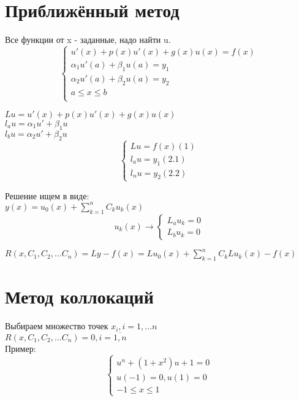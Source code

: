 \section{Приближённый метод}
Все функции от x - заданные, надо найти u.
\begin{equation}
\begin{cases}
u'(x) + p(x)u'(x) + g(x)u(x) = f(x)\\
\alpha_{1}u'(a) + \beta_{1}u(a) = y_{1}\\
\alpha_{2}u'(a) + \beta_{2}u(a) = y_{2}\\
a \leqslant x \leqslant b\\
\end{cases}
\end{equation}

$Lu = u'(x) + p(x) u'(x) + g(x) u(x)$\\
$l_{a}u = \alpha_{1}u' + \beta_{1}u$\\
$l_{b}u = \alpha_{2}u' + \beta_{2}u$\\

\begin{equation}
\begin{cases}
Lu = f(x) (1)\\
l_{a}u = y_{1} (2.1)\\
l_{n}u = y_{2} (2.2)
\end{cases}
\end{equation}

Решение ищем в виде:\\
$y(x) = u_{0}(x) + \sum\limits_{k=1}^{n} C_{k} u_{k}(x)$\\
\begin{equation}
u_{k}(x) \rightarrow 
\begin{cases}
L_{a}u_{k} = 0\\
L_{b}u_{k} = 0
\end{cases}
\end{equation}

$R(x, C_{1}, C_{2}, ... C_{n}) = Ly - f(x) = Lu_{0}(x) + \sum\limits_{k=1}^{n} C_{k} L u_{k}(x) - f(x)$

\section{Метод коллокаций}
Выбираем множество точек $x_{i}, i = 1, ... n$\\
$R(x, C_{1}, C_{2}, ... C_{n}) = 0, i = \overline{1, n}$\\

Пример:\\
\begin{equation}
\begin{cases}
u^{n} + (1 + x^{2})u + 1 = 0\\
u(-1) = 0, u(1) = 0\\
-1 \leqslant x \leqslant 1
\end{cases}
\end{equation}

